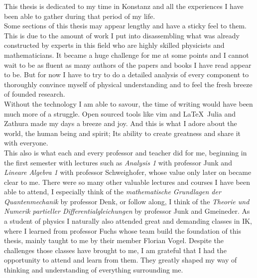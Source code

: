 


This thesis is dedicated to my time in Konstanz and all the experiences I have been able to gather during that period of my life. \\

Some sections of this thesis may appear lengthy and have a sticky feel to them. This is due to the amount of work I put into disassembling what was already constructed by experts in this field who are highly skilled physicists and mathematicians. It became a huge challenge for me at some points and I cannot wait to be as fluent as many authors of the papers and books I have read appear to be. But for now I have to try to do a detailed analysis of every component to thoroughly convince myself of physical understanding and to feel the fresh breeze of founded research. \\

Without the technology I am able to savour, the time of writing would have been much more of a struggle. Open sourced tools like vim and \LaTeX\, Julia and Zathura made my days a breeze and joy. And this is what I adore about the world, the human being and spirit; Its ability to create greatness and share it with everyone. \\

This also is what each and every professor and teacher did for me, beginning in the first semester with lectures such as \emph{Analysis 1} with professor Junk and \emph{Lineare Algebra 1} with professor Schweighofer, whose value only later on became clear to me. There were so many other valuable lectures and courses I have been able to attend, I especially think of the \emph{mathematische Grundlagen der Quantenmechanik} by professor Denk, or follow along, I think of the \emph{Theorie und Numerik partieller Differentialgleichungen} by professor Junk and Gmeineder. As a student of physics I naturally also attended great and demanding classes in IK, where I learned from professor Fuchs whose team build the foundation of this thesis, mainly taught to me by their member Florian Vogel. Despite the challenges those classes have brought to me, I am grateful that I had the opportunity to attend and learn from them. They greatly shaped my way of thinking and understanding of everything surrounding me. \\


